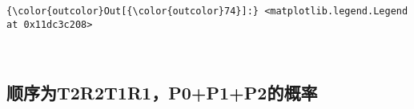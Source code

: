 \documentclass[11pt]{article}
\begin{document}
\begin{Verbatim}[commandchars=\\\{\}]
{\color{outcolor}Out[{\color{outcolor}74}]:} <matplotlib.legend.Legend at 0x11dc3c208>
\end{Verbatim}
            
    \begin{center}
    \end{center}
    { \hspace*{\fill} \\}
    
    \subsection{顺序为T2R2T1R1，P0+P1+P2的概率}\label{ux987aux5e8fux4e3at2r2t1r1p0p1p2ux7684ux6982ux7387}
\end{document}

